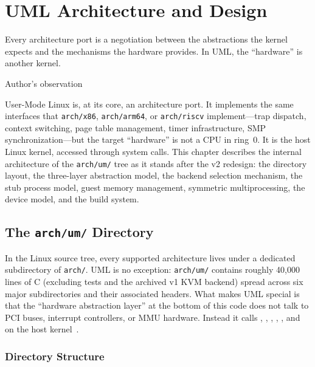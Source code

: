 \chapter{UML Architecture and Design}
\label{ch:architecture}

\epigraph{%
  Every architecture port is a negotiation between the abstractions the kernel
  expects and the mechanisms the hardware provides.  In UML, the ``hardware''
  is another kernel.%
}{Author's observation}

User-Mode Linux is, at its core, an architecture port.  It implements the same
interfaces that \texttt{arch/x86}, \texttt{arch/arm64}, or \texttt{arch/riscv}
implement---trap dispatch, context switching, page table management, timer
infrastructure, SMP synchronization---but the target ``hardware'' is not a CPU
in ring~0.  It is the host Linux kernel, accessed through system calls.  This
chapter describes the internal architecture of the \texttt{arch/um/} tree as it
stands after the v2 redesign: the directory layout, the three-layer abstraction
model, the backend selection mechanism, the stub process model, guest memory
management, symmetric multiprocessing, the device model, and the build system.


\section{The \texttt{arch/um/} Directory}
\label{sec:arch-um-dir}

In the Linux source tree, every supported architecture lives under a dedicated
subdirectory of \texttt{arch/}.  UML is no exception: \texttt{arch/um/}
contains roughly 40{,}000 lines of C (excluding tests and the archived v1 KVM
backend) spread across six major subdirectories and their associated headers.
What makes UML special is that the ``hardware abstraction layer'' at the bottom
of this code does not talk to PCI buses, interrupt controllers, or MMU hardware.
Instead it calls , , ,
, , and  on the host
kernel~\cite{dike2000,dike2006book}.

\subsection{Directory Structure}

